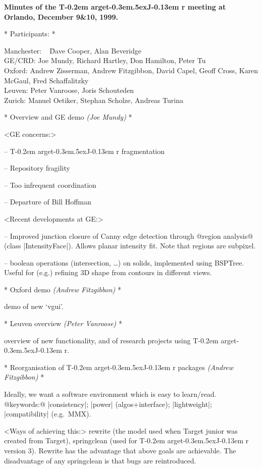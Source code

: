 \documentclass[11pt]{article}
\def\TargetJr{{T\kern-0.2em arget\kern-0.3em\lower.5ex\hbox{\Large J}\kern-0.13em r}}
\def\by#1.{{\normalsize\sf\it(#1)}}\relax
\begin{document}
  \centerline{\bf\large
Minutes of the \TargetJr{} meeting at Orlando, December 9\&10, 1999.
  }


* Participants: *

  \begin{tabbing}
Manchester: ~ \= Dave Cooper, Alan Beveridge \\
GE/CRD:       \> Joe Mundy, Richard Hartley, Don Hamilton, Peter Tu \\
Oxford:       \> Andrew Zisserman, Andrew Fitzgibbon, David Capel, Geoff Cross,
                 Karen McGaul, Fred Schaffalitzky \\
Leuven:       \> Peter Vanroose, Joris Schouteden \\
Zurich:       \> Manuel Oetiker, Stephan Scholze, Andreas Turina \\
  \end{tabbing}


* Overview and GE demo \by Joe Mundy. *

<GE concerns:>

-- \TargetJr{} fragmentation

-- Repository fragility

-- Too infrequent coordination

-- Departure of Bill Hoffman

<Recent developments at GE:>

-- Improved junction closure of Canny edge detection through @region analysis@
(class |IntensityFace|).  Allows planar intensity fit.  Note that regions are
subpixel.

-- boolean operations (intersection, \dots) on solids, implemented using
BSPTree.  Useful for (e.g.) refining 3D shape from contours in different
views.


* Oxford demo \by Andrew Fitzgibbon. *

demo of new `vgui'.


* Leuven overview \by Peter Vanroose. *

overview of new functionality, and of research projects using \TargetJr.


* Reorganisation of \TargetJr{} packages \by Andrew Fitzgibbon. *

Ideally, we want a software environment which is easy to learn/read.\\
@keywords:@ |consistency|; |power| (algos+interface);
|lightweight|; |compatibility| (e.g.~MMX).

<Ways of achieving this:> rewrite (the model used when Target junior was
created from Target), springclean (used for \TargetJr{} version 3).
Rewrite has the advantage that above goals are achievable.  The
disadvantage of any springclean is that bugs are reintroduced.
\end{document}
